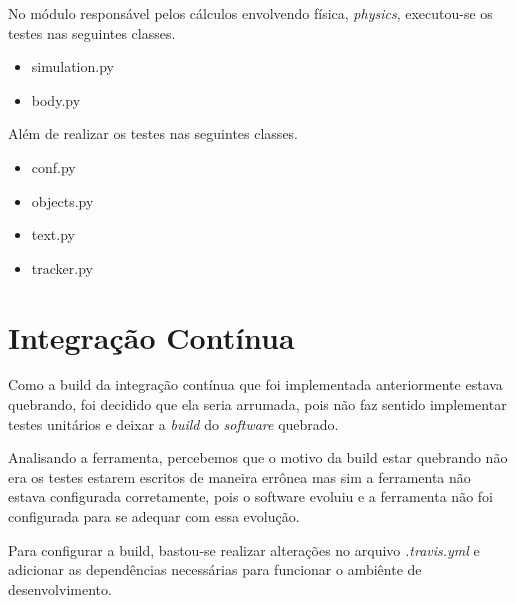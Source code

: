 No módulo responsável pelos cálculos envolvendo física, \textit{physics}, executou-se os testes nas seguintes classes.
\begin{itemize}
\item simulation.py
\item body.py
\end{itemize}

Além de realizar os testes nas seguintes classes.
\begin{itemize}
\item conf.py
\item objects.py
\item text.py
\item tracker.py
\end{itemize}

\section{Integração Contínua}

Como a build da integração contínua que foi implementada anteriormente estava quebrando, foi decidido que ela seria arrumada, pois não faz sentido implementar testes unitários e deixar a \textit{build} do \textit{software} quebrado.

Analisando a ferramenta, percebemos que o motivo da build estar quebrando não era os testes estarem escritos de maneira errônea mas sim a ferramenta não estava configurada corretamente, pois o software evoluiu e a ferramenta não foi configurada para se adequar com essa evolução.

Para configurar a build, bastou-se realizar alterações no arquivo \textit{.travis.yml} e adicionar as dependências necessárias para funcionar o ambiênte de desenvolvimento.

